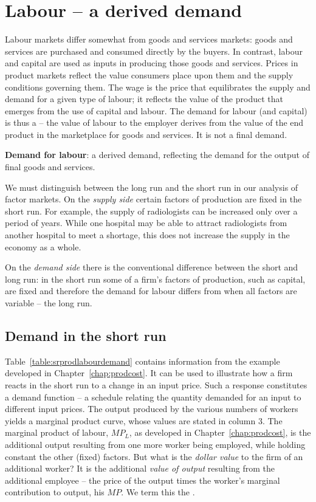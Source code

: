 \section{Labour -- a derived demand}\label{sec:ch12sec1}

Labour markets differ somewhat from goods and services markets: goods and services are purchased and consumed directly by the buyers. In contrast, labour and capital are used as inputs in producing those goods and services. Prices in product markets reflect the value consumers place upon them and the supply conditions governing them. The wage is the price that equilibrates the supply and demand for a given type of labour; it reflects the value of the product that emerges from the use of capital and labour. The demand for labour (and capital) is thus a  -- the value of labour to the employer derives from the value of the end product in the marketplace for goods and services. It is not a final demand. 

\begin{DefBox}
\textbf{Demand for labour}: a derived demand, reflecting the demand for the output of final goods and services.
\end{DefBox}

We must distinguish between the long run and the short run in our analysis of factor markets. On the \textit{supply side} certain factors of production are fixed in the short run. For example, the supply of radiologists can be increased only over a period of years. While one hospital may be able to attract radiologists from another hospital to meet a shortage, this does not increase the supply in the economy as a whole.  

On the \textit{demand side} there is the conventional difference between the short and long run: in the short run some of a firm's factors of production, such as capital, are fixed and therefore the demand for labour differs from when all factors are variable -- the long run.

\subsection*{Demand in the short run}

Table~\ref{table:srprodlabourdemand} contains information from the example developed in Chapter~\ref{chap:prodcost}. It can be used to illustrate how a firm reacts in the short run to a change in an input price.  Such a response constitutes a demand function -- a schedule relating the quantity demanded for an input to different input prices. The output produced by the various numbers of workers yields a marginal product curve, whose values are stated in column 3. The marginal product of labour, $MP_L$, as developed in Chapter~\ref{chap:prodcost}, is the additional output resulting from one more worker being employed, while holding constant the other (fixed) factors. But what is the \textit{dollar value} to the firm of an additional worker? It is the additional \textit{value of output} resulting from the additional employee -- the price of the output times the worker's marginal contribution to output, his $MP$. We term this the .

